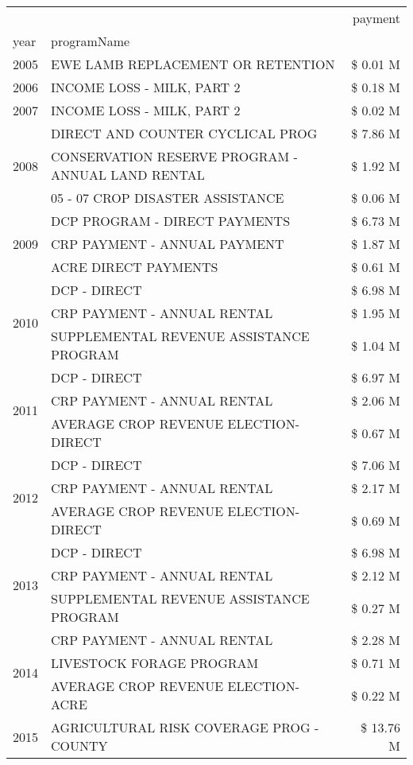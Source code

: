 \begin{tabular}{llr}
\toprule
 &  & payment \\
year & programName &  \\
\midrule
2005 & EWE LAMB REPLACEMENT OR RETENTION & \$ 0.01 M \\
\cline{1-3}
2006 & INCOME LOSS - MILK, PART 2 & \$ 0.18 M \\
\cline{1-3}
2007 & INCOME LOSS - MILK, PART 2 & \$ 0.02 M \\
\cline{1-3}
\multirow[t]{3}{*}{2008} & DIRECT AND COUNTER CYCLICAL PROG & \$ 7.86 M \\
 & CONSERVATION RESERVE PROGRAM - ANNUAL LAND RENTAL & \$ 1.92 M \\
 & 05 - 07 CROP DISASTER ASSISTANCE & \$ 0.06 M \\
\cline{1-3}
\multirow[t]{3}{*}{2009} & DCP PROGRAM - DIRECT PAYMENTS & \$ 6.73 M \\
 & CRP PAYMENT - ANNUAL PAYMENT & \$ 1.87 M \\
 & ACRE DIRECT PAYMENTS & \$ 0.61 M \\
\cline{1-3}
\multirow[t]{3}{*}{2010} & DCP - DIRECT & \$ 6.98 M \\
 & CRP PAYMENT - ANNUAL RENTAL & \$ 1.95 M \\
 & SUPPLEMENTAL REVENUE ASSISTANCE PROGRAM & \$ 1.04 M \\
\cline{1-3}
\multirow[t]{3}{*}{2011} & DCP - DIRECT & \$ 6.97 M \\
 & CRP PAYMENT - ANNUAL RENTAL & \$ 2.06 M \\
 & AVERAGE CROP REVENUE ELECTION-DIRECT & \$ 0.67 M \\
\cline{1-3}
\multirow[t]{3}{*}{2012} & DCP - DIRECT & \$ 7.06 M \\
 & CRP PAYMENT - ANNUAL RENTAL & \$ 2.17 M \\
 & AVERAGE CROP REVENUE ELECTION-DIRECT & \$ 0.69 M \\
\cline{1-3}
\multirow[t]{3}{*}{2013} & DCP - DIRECT & \$ 6.98 M \\
 & CRP PAYMENT - ANNUAL RENTAL & \$ 2.12 M \\
 & SUPPLEMENTAL REVENUE ASSISTANCE PROGRAM & \$ 0.27 M \\
\cline{1-3}
\multirow[t]{3}{*}{2014} & CRP PAYMENT - ANNUAL RENTAL & \$ 2.28 M \\
 & LIVESTOCK FORAGE PROGRAM & \$ 0.71 M \\
 & AVERAGE CROP REVENUE ELECTION-ACRE & \$ 0.22 M \\
\cline{1-3}
\multirow[t]{3}{*}{2015} & AGRICULTURAL RISK COVERAGE PROG - COUNTY & \$ 13.76 M \\

\end{tabular}

